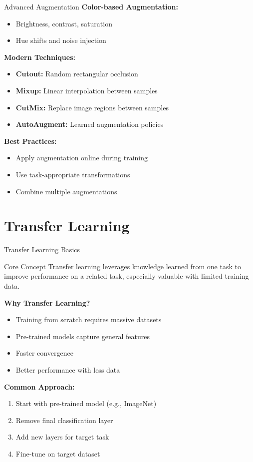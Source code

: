 \documentclass[aspectratio=169,10pt]{beamer}
\begin{document}
\begin{frame}{Advanced Augmentation}
\textbf{Color-based Augmentation:}
\begin{itemize}
\item Brightness, contrast, saturation
\item Hue shifts and noise injection
\end{itemize}

\textbf{Modern Techniques:}
\begin{itemize}
\item \textbf{Cutout:} Random rectangular occlusion
\item \textbf{Mixup:} Linear interpolation between samples
\item \textbf{CutMix:} Replace image regions between samples
\item \textbf{AutoAugment:} Learned augmentation policies
\end{itemize}

\textbf{Best Practices:}
\begin{itemize}
\item Apply augmentation online during training
\item Use task-appropriate transformations
\item Combine multiple augmentations
\end{itemize}
\end{frame}

\section{Transfer Learning}

\begin{frame}{Transfer Learning Basics}
\begin{alertblock}{Core Concept}
Transfer learning leverages knowledge learned from one task to improve performance on a related task, especially valuable with limited training data.
\end{alertblock}

\textbf{Why Transfer Learning?}
\begin{itemize}
\item Training from scratch requires massive datasets
\item Pre-trained models capture general features
\item Faster convergence
\item Better performance with less data
\end{itemize}

\textbf{Common Approach:}
\begin{enumerate}
\item Start with pre-trained model (e.g., ImageNet)
\item Remove final classification layer
\item Add new layers for target task
\item Fine-tune on target dataset
\end{enumerate}
\end{frame}
\end{document}

